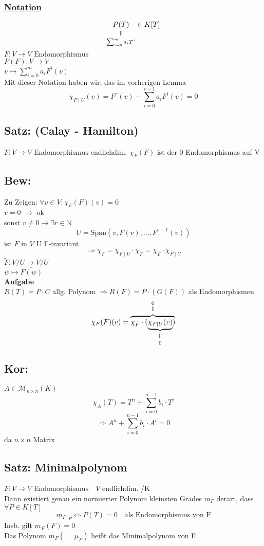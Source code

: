 \documentclass[titlepage,12pt,a4paper,ngerman]{report}
\newcommand{\verteq}{\rotatebox{90}{$\,=$}}
\newcommand{\equalto}[2]{\underset{\scriptstyle\overset{\mkern4mu\verteq}{#2}}{#1}}
\newcommand{\equaltoup}[2]{\overset{\scriptstyle\underset{\mkern4mu\verteq}{#2}}{#1}}
\newcommand{\enph}{F: V \to V \textrm{ Endomorphismus}}
\begin{document}
\noindent
\subsubsection*{\underline{Notation}}
$$\equalto{P(T)}{\sum^m_{i=0} a_i T^i} \in K[T]$$
$\enph$\\
$P(F): V\to V $\\
$ v\mapsto \sum^m_{i=0} a_i F^i(v)$\\
Mit dieser Notation haben wir, das im vorherigen Lemma
$$\chi_{F \mid U} (v) = F^r(v) - \sum^{r-1}_{i=0} a_i F^i(v) = 0$$
\subsection{Satz: (Calay - Hamilton)}
$\enph $ endlichdim.
$\chi_F(F)$ ist der 0 Endomorphismus auf V
\subsection{Bew:}
Zu Zeigen:
$\forall v\in V : \chi_F(F)(v) = 0$\\
\underline{$v=0$} $\rightarrow$ ok\\
sonst $v\neq 0 \rightarrow \exists r \in \mathbb{N}$
$$ U = \textrm{Span}(v,F(v), \dots, F^{r-1}(v))$$
ist $F$ in $V$
U F-invariant
$$\Rightarrow \chi_F = \chi_{F \mid U} \cdot \chi_{\tilde{F}} = \chi_{\tilde{F}} \cdot \chi_{F \mid U}$$
$\tilde{F}: V/U \to V/U$\\
$\bar{w} \mapsto \bar{F(w)}$\\
\textbf{Aufgabe}\\
$R(T) = P \cdot C$ allg. Polynom
$\Rightarrow R(F) = P \cdot (G(F))$ als Endomorphismen
$$\chi_F(F)(v) = \equaltoup{\overbrace{\chi_{\tilde{F}} \cdot (\equalto{\underbrace{\chi_{F \mid U}(v)}}{0})}}{0} $$

\subsection{Kor:}
$A \in \mathcal{M}_{n\times n}(K)$
$$\chi_A(T) = T^n + \sum^{n-1}_{i=0} b_i \cdot T^i$$
$$\Rightarrow A^n + \sum^{n-1}_{i=0} b_i \cdot A^i = 0$$
da $n\times n$ Matrix
\subsection{Satz: Minimalpolynom}
$\enph \quad V$ endlichdim. /K\\
Dann existiert genau ein normierter Polynom kleinsten Grades $m_F$ derart, dass $\forall P\in K[T]$\\
$$m_F | _P \Leftrightarrow P(T) = 0  \quad \textrm{als Endomorphismus von F}$$
Insb. gilt $m_F(F) = 0$\\
Das Polynom $m_F (= \mu _F)$ heißt das Minimalpolynom von F.\\																										
\end{document}
